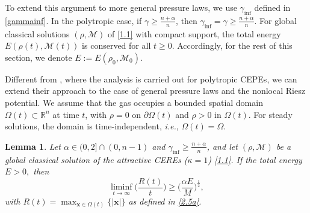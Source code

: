 \documentclass[reqno,11pt]{amsart}
\numberwithin{equation}{section}
\newcommand{\R}{\mathbb{R}}
\newtheorem{lemma}[theorem]{Lemma}
\theoremstyle{definition}
\begin{document}
To extend this argument to more general pressure laws, we use 
$\gamma_{\inf}$ defined in \eqref{gammainf}.
In the polytropic case, if $\gamma \geq \frac{n + \alpha}{n}$, 
then $\gamma_{\inf} = \gamma \geq \frac{n + \alpha}{n}$. 
For global classical solutions $(\rho,\mathcal{M})$ of \eqref{1.1} with compact support, 
the total energy $E(\rho(t),\mathcal{M}(t))$ is conserved for all $t\geq 0$. 
Accordingly, for the rest of this section, we denote 
$E := E(\rho_0,\mathcal{M}_0)$. 

Different from \cite{Deng_2002}, where the analysis is carried out for polytropic CEPEs, 
we can extend their approach to the case of general pressure laws and the nonlocal Riesz potential. 
We assume that the gas occupies a bounded spatial domain $\Omega(t)\subset\mathbb{\R}^n$ at time $t$, 
with $\rho=0$ on $\partial\Omega(t)$ and $\rho>0$ in $\Omega(t)$.  
For steady solutions, the domain is time-independent, {\it i.e.}, $\Omega(t)=\Omega$.

\begin{lemma}\label{E>0,general}
Let $\alpha\in(0,2]\cap (0,n-1)$ and $\gamma_{\inf} \geq \frac{n + \alpha}{n}$, and 
let $(\rho,\mathcal{M})$ be a global classical solution of the attractive 
CEREs {\rm (}$\kappa = 1${\rm )} \eqref{1.1}. 
If the total energy $E>0,$ then
$$\liminf_{t\rightarrow\infty}\Big(\frac{R(t)}{t}\Big)\geq\Big(\frac{\alpha E}{M}\Big)^{\frac{1}{2}},$$
with $R(t)=\max_{\boldsymbol{x}\in\Omega(t)}\{|\boldsymbol{x}|\}$ as defined in \eqref{2.5a}.
\end{lemma}
\end{document}
